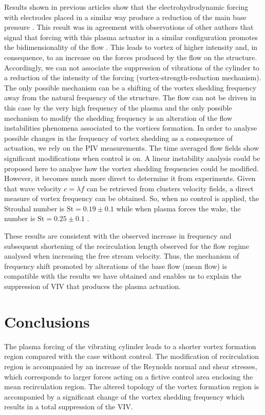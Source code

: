 \documentclass[review]{elsarticle}
\begin{document}
Results shown in previous articles show that the electrohydrodynamic forcing with electrodes placed in a similar way produce a reduction of the main base pressure \citep{Artana2003}. This result was in agreement with observations of other authors that signal that forcing with this plasma actuator in a similar configuration promotes the bidimensionality of the flow \citep{Munska2005}. This leads to vortex of higher intensity and, in consequence, to an increase on the forces produced by the flow on the structure. Accordingly, we can not associate the suppression of vibrations of the cylinder to a reduction of the intensity of the forcing (vortex-strength-reduction mechanism). The only possible mechanism can be a shifting of the vortex shedding frequency away from the natural frequency of the structure. The flow can not be driven in this case by the very high frequency of the plasma and the only possible mechanism to modify the shedding frequency is an alteration of the flow instabilities phenomena associated to the vortices formation. In order to analyse possible changes in the frequency of vortex shedding as a consequence of actuation, we rely on the PIV measurements. The time averaged flow fields show significant modifications when control is on. A linear instability analysis could be proposed here to analyse how the vortex shedding frequencies could be modified. However, it becomes much more direct to determine it from experiments. Given that wave velocity $c=\lambda f$ can be retrieved from clusters velocity fields, a direct measure of vortex frequency can be obtained. So, when no control is applied, the Strouhal number is $\text {St}=0.19\pm 0.1$ while when plasma forces the wake, the number is $\text{St}=0.25\pm 0.1$ .

These results are consistent with the observed increase in frequency and subsequent shortening of the recirculation length observed for the flow regime analysed when increasing the free stream velocity. Thus, the mechanism of frequency shift promoted by alterations of the base flow (mean flow) is compatible with the results we have obtained and enables us to explain the suppression of VIV that produces the plasma actuation.

\section{Conclusions}
\label{sec:Conc}

The plasma forcing of the vibrating cylinder leads to a shorter vortex formation region compared with the case without control. The modification of recirculation region is accompanied by an increase of the Reynolds normal and shear stresses, which corresponds to larger forces acting on a fictive control area enclosing the mean recirculation region. The altered topology of the vortex formation region is accompanied by a significant change of the vortex shedding frequency which results in a total suppression of the VIV.
\end{document}
